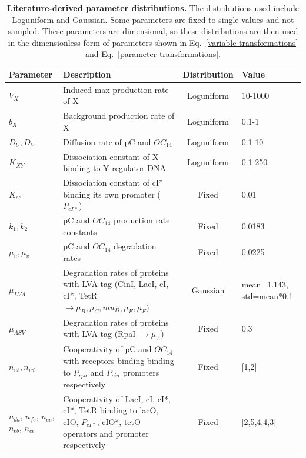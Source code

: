 \begin{table}[H]
    \caption{\textbf{Literature-derived parameter distributions.} The distributions used include Loguniform and Gaussian. Some parameters are fixed to single values and not sampled. These parameters are dimensional, so these distributions are then used in the dimensionless form of parameters shown in Eq.~\ref{variable transformations} and Eq.~\ref{parameter transformations}.}
\label{tab:param distributions}
\renewcommand{\arraystretch}{1.3} %
\begin{tabular}{|p{20mm}|p{57mm}|c|p{25mm}|}
\hline
\textbf{Parameter} & \textbf{Description} & \textbf{Distribution} & \textbf{Value}\\
\hline

$V_{X}$ & Induced max production rate of X & Loguniform &  10-1000 \\
\hline
$b_{X}$ & Background production rate of X & Loguniform & 0.1-1\\
\hline
$D_{U}, D_{V}$ & Diffusion rate of pC and $OC_{14}$ & Loguniform & 0.1-10\\
\hline
$K_{XY}$ & Dissociation constant of X binding to Y regulator DNA & Loguniform & 0.1-250\\
\hline
$K_{ee}$ & Dissociation constant of cI* binding its own promoter ($P_{cI*}$) & Fixed & 0.01\\
\hline
$k_{1},k_{2}$ & pC and $OC_{14}$ production rate constants  & Fixed & 0.0183\\
\hline
$\mu_{u},\mu_{v}$ & pC and $OC_{14}$ degradation rates & Fixed & 0.0225\\
\hline
$\mu_{LVA}$ & Degradation rates of proteins with LVA tag (CinI, LacI, cI, cI*, TetR $\rightarrow \mu_{B}, \mu_{C}, mu_{D}, \mu_{E}, \mu_{F}$) & Gaussian & mean=1.143, std=mean*0.1\\
\hline
$\mu_{ASV}$ & Degradation rates of proteins with LVA tag (RpaI $\rightarrow \mu_{A}$) & Fixed & 0.3\\
\hline
$n_{ub}, n_{vd}$ & Cooperativity of pC and $OC_{14}$ with receptors binding binding to $P_{rpa}$ and $P_{cin}$ promoters respectively & Fixed & [1,2]\\
\hline
$n_{da}$, $n_{fe}$, $n_{ee}$, $n_{eb}$, $n_{ce}$ & Cooperativity of LacI, cI, cI*, cI*, TetR binding to lacO, cIO, $P_{cI*}$, cIO*, tetO operators and promoter respectively & Fixed & [2,5,4,4,3]\\
\hline
\end{tabular}
\end{table}

